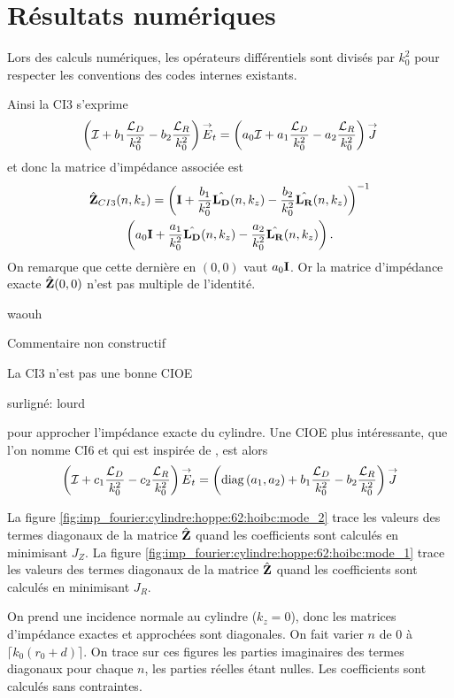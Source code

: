 \section{Résultats numériques}

  Lors des calculs numériques, les opérateurs différentiels sont divisés par \(k_0^2\) pour respecter les conventions des codes internes existants.

  Ainsi la CI3 s'exprime  
  \begin{equation*}
    \left({\mathcal{I}} + b_1\dfrac{{\mathcal{L}_D}}{k_0^2} -b_2\dfrac{{\mathcal{L}_R}}{k_0^2}\right){\overset{\rightarrow}{E}}_t = \left(a_0{\mathcal{I}} + a_1\dfrac{{\mathcal{L}_D}}{k_0^2} - a_2 \dfrac{{\mathcal{L}_R}}{k_0^2} \right){\overset{\rightarrow}{J}}
  \end{equation*}
  et donc la matrice d'impédance associée est
  \begin{multline*}
    \hat{\mathbf{Z}}_{CI3}(n,k_z) = \left(\mathbf{I} + \dfrac{b_1}{k_0^2}\hat{\mathbf{L_D}}(n,k_z)- \dfrac{b_2}{k_0^2}\hat{\mathbf{L_R}}(n,k_z)\right)^{-1}
    \\
    \left(a_0\mathbf{I} + \dfrac{a_1}{k_0^2}\hat{\mathbf{L_D}}(n,k_z)- \dfrac{a_2}{k_0^2}\hat{\mathbf{L_R}}(n,k_z)\right).
  \end{multline*}
  On remarque que cette dernière en \((0,0)\) vaut \(a_0\mathbf{I}\).
  Or la matrice d'impédance exacte \(\hat{\mathbf{Z}}(0,0)\) n'est pas multiple de l'identité.
\begin{REM}
  waouh
\end{REM}
\begin{REP}
  Commentaire non constructif
\end{REP}
  La CI3 n'est pas une bonne CIOE
\begin{REM}
  surligné: lourd
\end{REM} 
   pour approcher l'impédance exacte du cylindre.
  Une CIOE plus intéressante, que l'on nomme CI6 et qui est inspirée de \cite[p.~60]{hoppe_impedance_1995}, est alors
  \begin{equation*}
    \left({\mathcal{I}} + c_1\dfrac{{\mathcal{L}_D}}{k_0^2} -c_2\dfrac{{\mathcal{L}_R}}{k_0^2}\right){\overset{\rightarrow}{E}}_t = \left(\operatorname{diag}\left(a_1,a_2\right) + b_1\dfrac{{\mathcal{L}_D}}{k_0^2} - b_2 \dfrac{{\mathcal{L}_R}}{k_0^2} \right){\overset{\rightarrow}{J}}
  \end{equation*}

  La figure \ref{fig:imp_fourier:cylindre:hoppe:62:hoibc:mode_2} trace les valeurs des termes diagonaux de la matrice \(\hat{\mathbf{Z}}\) quand les coefficients sont calculés en minimisant \(J_Z\).
  La figure \ref{fig:imp_fourier:cylindre:hoppe:62:hoibc:mode_1} trace les valeurs des termes diagonaux de la matrice \(\hat{\mathbf{Z}}\) quand les coefficients sont calculés en minimisant \(J_R\).

  On prend une incidence normale au cylindre (\(k_z=0\)), donc les matrices d'impédance exactes et approchées sont diagonales.
  On fait varier \(n\) de 0 à \(\lceil k_0 (r_0+d) \rceil\). On trace sur ces figures les parties imaginaires des termes diagonaux pour chaque \(n\), les parties réelles étant nulles.
  Les coefficients sont calculés sans contraintes.

